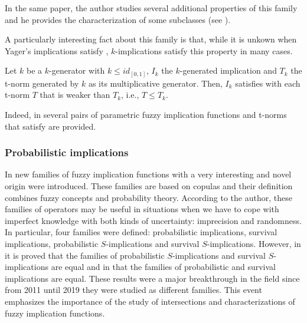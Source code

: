 In the same paper, the author studies several additional properties of this family and he provides the characterization of some subclasses (see \cite[Theorems 2, 5 and 6]{Zhou2021}).

A particularly interesting fact about this family is that, while it is unkown when Yager's implications satisfy \TC, $k$-implications satisfy this property in many cases.

\begin{proposition} 
	Let $k$ be a $k$-generator with $k\leq id_{[0,1]}$, $I_k$ the $k$-generated implication and $T_k$ the t-norm generated
	by $k$ as its multiplicative generator. Then, $I_k$ satisfies \TC with
	each t-norm $T$ that is weaker than $T_k$, i.e., $T\leq T_k$.
\end{proposition}

Indeed, in 	\cite[Example 4]{Zhou2021} several pairs of parametric fuzzy implication functions and t-norms that satisfy \TC are provided.


\subsubsection{Probabilistic implications}

In \cite{Grzegorzewski2011,Grzegorzewski2012} new families of fuzzy implication functions with a very interesting and novel origin were introduced. These families  are based on copulas and their definition combines fuzzy concepts and probability theory. According to the author, these families of operators may be useful in situations when we have to cope with imperfect knowledge with both kinds of uncertainty: imprecision and randomness. In particular, four families were defined: probabilistic implications, survival implications, probabilistic $S$-implications and survival $S$-implications. However, in \cite{Massanet2017B} it is proved that the families of probabilistic $S$-implications and survival $S$-implications are equal and in \cite{Massanet2019D} that the families of probabilistic and survival implications are equal. These results were a major breakthrough in the field since from 2011 until 2019 they were studied as different families. This event emphasizes the importance of the study of intersections and characterizations of fuzzy implication functions.

